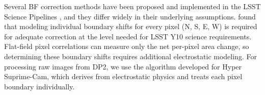 Several BF correction methods have been proposed and implemented in the LSST Science Pipelines \citep{gruen-2015,coulton-2018,astier-regnault-2023,broughton2024}, and they differ widely in their underlying assumptions.
\citet{broughton2024} found that modeling individual boundary shifts for every pixel (N, S, E, W) is required for adequate correction at the level needed for LSST Y10 science requirements.
Flat-field pixel correlations can measure only the net per-pixel area change, so determining these boundary shifts requires additional electrostatic modeling.
For processing raw images from DP2, we use the \citet{astier-regnault-2023} algorithm developed for Hyper Suprime-Cam, which derives from electrostatic physics and treats each pixel boundary individually.


